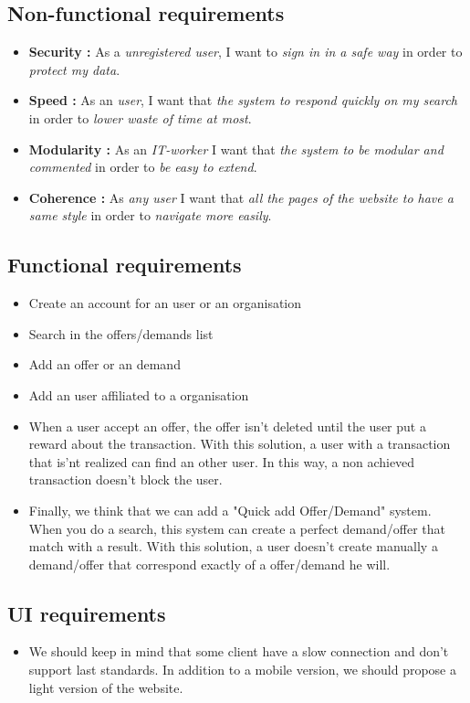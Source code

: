 \subsection{Non-functional requirements}
\begin{itemize}

    \item \textbf{Security :} As a \textit{unregistered user}, I want to \textit{sign in in a safe way} in order to \textit{protect my data}.

    \item \textbf{Speed :} As an \textit{user}, I want that \textit{the system to respond quickly on my search} in order to \textit{lower waste of time at most}.

    \item \textbf{Modularity :} As an \textit{IT-worker} I want that \textit{the system to be modular and commented} in order to \textit{be easy to extend}.

    \item \textbf{Coherence : }  As \textit{any user} I want that \textit{all the pages of the website to have a same style} in order to \textit{navigate more easily}.

\end{itemize}
\subsection{Functional requirements}
\begin{itemize}

    \item Create an account for an user or an organisation

    \item Search in the offers/demands list

    \item Add an offer or an demand

    \item Add an user affiliated to a organisation
    
    \item When a user accept an offer, the offer isn't deleted until the user put a reward about the transaction.  With this solution, a user with a transaction that is'nt realized can find an other user.  In this way, a non achieved transaction doesn't block the user.
    \item Finally, we think that we can add a "Quick add Offer/Demand" system.  When you do a search, this system can create a perfect demand/offer that match with a result.  With this solution, a user doesn't create manually a demand/offer that correspond exactly of a offer/demand he will.

\end{itemize}
\subsection{UI requirements}
\begin{itemize}

    \item We should keep in mind that some client have a slow connection and don't support last standards. In addition to a mobile version, we should propose a light version of the website.

\end{itemize}